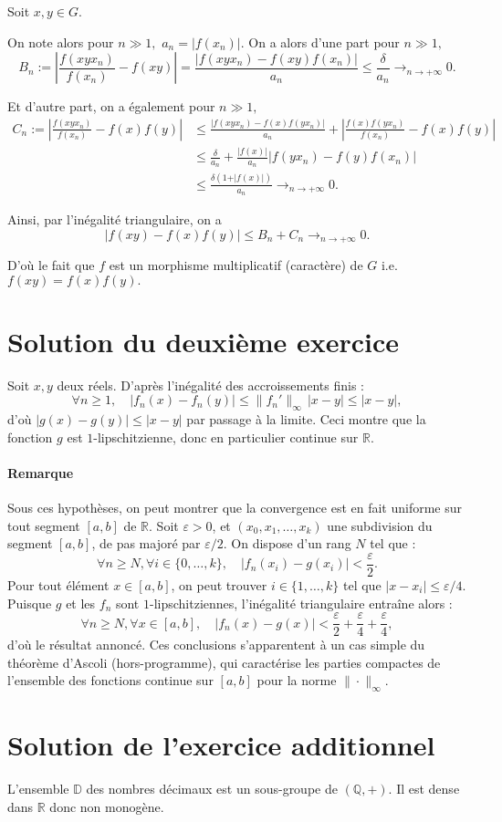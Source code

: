 Soit $x,y\in G.$ 

On note alors pour $n\gg 1,$ $a_{n}=\vert f(x_{n})\vert.$
On a alors d'une part pour $n\gg1,$ $$B_{n}:=\left \vert \frac{f(xyx_{n})}{f(x_{n})}-f(xy) \right\vert =\frac{ \vert f(xyx_{n})-f(xy)f(x_{n}) \vert }{a_{n}}\leq \frac{\delta}{a_{n}}\longrightarrow_{n\rightarrow +\infty} 0.$$

Et d'autre part, on a également pour $n\gg 1,$ 
\begin{align*}
C_{n}:=\left\vert \frac{f(xyx_{n})}{f(x_{n})}-f(x)f(y) \right\vert & \leq \frac{ \vert f(xyx_{n})-f(x)f(yx_{n})\vert }{a_{n}}+ \left\vert \frac{f(x)f(yx_{n})}{f(x_{n})}-f(x)f(y) \right\vert\\
& \leq \frac{\delta}{a_{n}}+ \frac{\vert f(x) \vert }{a_{n}}\vert f(yx_{n})-f(y)f(x_{n})\vert\\
& \leq \frac{\delta(1+\vert f(x) \vert )}{a_{n}}\longrightarrow_{n\rightarrow +\infty} 0.
\end{align*}

Ainsi, par l'inégalité triangulaire, on a $$\vert f(xy)-f(x)f(y)\vert \leq B_{n}+C_{n}\longrightarrow_{n\rightarrow +\infty}0.$$

D'où le fait que $f$ est un morphisme multiplicatif (caractère) de $G$ i.e. $\displaystyle f(xy)=f(x)f(y).$

\section{Solution du deuxième exercice} %

Soit $x,y$ deux réels. D'après l'inégalité des accroissements finis :
\[
\forall n \geqslant 1,\quad |f_n(x) - f_n(y)| \leqslant \|f_n'\|_\infty\,|x-y| \leqslant |x-y|,
\]
d'où $|g(x) - g(y)| \leqslant |x-y|$ par passage à la limite. Ceci montre que la fonction $g$ est $1$-lipschitzienne, donc en particulier continue sur $\mathbb R$.

\paragraph{Remarque} Sous ces hypothèses, on peut montrer que la convergence est en fait uniforme sur tout segment $[a,b]$ de $\mathbb R$. Soit $\varepsilon > 0$, et $(x_0,x_1,\dots,x_k)$ une subdivision du segment $[a,b]$, de pas majoré par $\varepsilon/2$. On dispose d'un rang $N$ tel que :
\[
\forall n\geqslant N,\forall i \in \{0,\dots,k\},\quad |f_n(x_i) - g(x_i)| < \frac{\varepsilon}2.
\]
Pour tout élément $x \in [a,b]$, on peut trouver $i \in \{1,\dots,k\}$ tel que $|x-x_i|\leqslant \varepsilon/4$. Puisque $g$ et les $f_n$ sont $1$-lipschitziennes, l'inégalité triangulaire entraîne alors :
\[
\forall n \geqslant N,\forall x \in [a,b],\quad |f_n(x) - g(x)| < \frac{\varepsilon}2 + \frac{\varepsilon}4 + \frac{\varepsilon}4,
\]
d'où le résultat annoncé.
Ces conclusions s'apparentent à un cas simple du théorème d'Ascoli (hors-programme), qui caractérise les parties compactes de l'ensemble des fonctions continue sur $[a,b]$ pour la norme $\|\cdot\|_\infty$.

\section{Solution de l'exercice additionnel}

L'ensemble $\mathbb D$ des nombres décimaux est un sous-groupe de $(\mathbb Q,+)$. Il est dense dans $\mathbb R$ donc non monogène. 